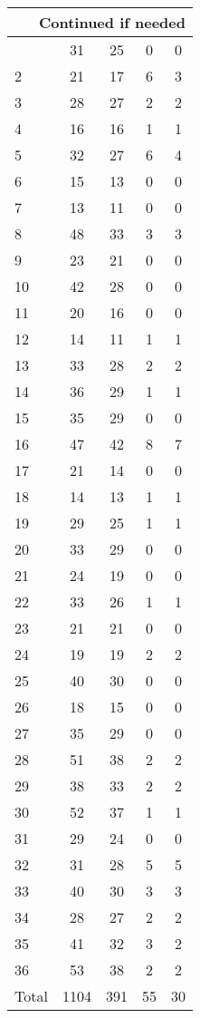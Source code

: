 \begin{center}
\begin{longtable}{l|c|c|c|c}
\hline \multicolumn{5}{|r|}{{Continued if needed}} \\ \hline
\endfoot 
1 & 31 & 25 & 0 & 0\\ \hline
2 & 21 & 17 & 6 & 3\\ \hline
3 & 28 & 27 & 2 & 2\\ \hline
4 & 16 & 16 & 1 & 1\\ \hline
5 & 32 & 27 & 6 & 4\\ \hline
6 & 15 & 13 & 0 & 0\\ \hline
7 & 13 & 11 & 0 & 0\\ \hline
8 & 48 & 33 & 3 & 3\\ \hline
9 & 23 & 21 & 0 & 0\\ \hline
10 & 42 & 28 & 0 & 0\\ \hline
11 & 20 & 16 & 0 & 0\\ \hline
12 & 14 & 11 & 1 & 1\\ \hline
13 & 33 & 28 & 2 & 2\\ \hline
14 & 36 & 29 & 1 & 1\\ \hline
15 & 35 & 29 & 0 & 0\\ \hline
16 & 47 & 42 & 8 & 7\\ \hline
17 & 21 & 14 & 0 & 0\\ \hline
18 & 14 & 13 & 1 & 1\\ \hline
19 & 29 & 25 & 1 & 1\\ \hline
20 & 33 & 29 & 0 & 0\\ \hline
21 & 24 & 19 & 0 & 0\\ \hline
22 & 33 & 26 & 1 & 1\\ \hline
23 & 21 & 21 & 0 & 0\\ \hline
24 & 19 & 19 & 2 & 2\\ \hline
25 & 40 & 30 & 0 & 0\\ \hline
26 & 18 & 15 & 0 & 0\\ \hline
27 & 35 & 29 & 0 & 0\\ \hline
28 & 51 & 38 & 2 & 2\\ \hline
29 & 38 & 33 & 2 & 2\\ \hline
30 & 52 & 37 & 1 & 1\\ \hline
31 & 29 & 24 & 0 & 0\\ \hline
32 & 31 & 28 & 5 & 5\\ \hline
33 & 40 & 30 & 3 & 3\\ \hline
34 & 28 & 27 & 2 & 2\\ \hline
35 & 41 & 32 & 3 & 2\\ \hline
36 & 53 & 38 & 2 & 2\\ \hline
\hline \hline
Total & 1104 & 391 & 55 & 30



\end{longtable}
\end{center}

